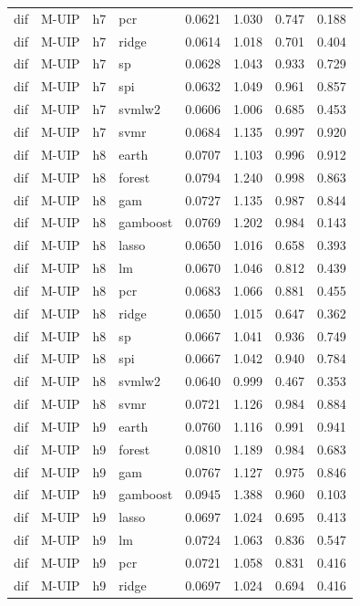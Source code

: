 \begin{ThreePartTable}
\begin{longtable}[t]{llclcccc}
dif & M-UIP & h7 & pcr & 0.0621 & 1.030 & 0.747 & 0.188\\
dif & M-UIP & h7 & ridge & 0.0614 & 1.018 & 0.701 & 0.404\\
dif & M-UIP & h7 & sp & 0.0628 & 1.043 & 0.933 & 0.729\\
dif & M-UIP & h7 & spi & 0.0632 & 1.049 & 0.961 & 0.857\\
dif & M-UIP & h7 & svmlw2 & 0.0606 & 1.006 & 0.685 & 0.453\\
dif & M-UIP & h7 & svmr & 0.0684 & 1.135 & 0.997 & 0.920\\
\addlinespace
dif & M-UIP & h8 & earth & 0.0707 & 1.103 & 0.996 & 0.912\\
dif & M-UIP & h8 & forest & 0.0794 & 1.240 & 0.998 & 0.863\\
dif & M-UIP & h8 & gam & 0.0727 & 1.135 & 0.987 & 0.844\\
dif & M-UIP & h8 & gamboost & 0.0769 & 1.202 & 0.984 & 0.143\\
dif & M-UIP & h8 & lasso & 0.0650 & 1.016 & 0.658 & 0.393\\
dif & M-UIP & h8 & lm & 0.0670 & 1.046 & 0.812 & 0.439\\
dif & M-UIP & h8 & pcr & 0.0683 & 1.066 & 0.881 & 0.455\\
dif & M-UIP & h8 & ridge & 0.0650 & 1.015 & 0.647 & 0.362\\
dif & M-UIP & h8 & sp & 0.0667 & 1.041 & 0.936 & 0.749\\
dif & M-UIP & h8 & spi & 0.0667 & 1.042 & 0.940 & 0.784\\
dif & M-UIP & h8 & svmlw2 & 0.0640 & 0.999 & 0.467 & 0.353\\
dif & M-UIP & h8 & svmr & 0.0721 & 1.126 & 0.984 & 0.884\\
\addlinespace
dif & M-UIP & h9 & earth & 0.0760 & 1.116 & 0.991 & 0.941\\
dif & M-UIP & h9 & forest & 0.0810 & 1.189 & 0.984 & 0.683\\
dif & M-UIP & h9 & gam & 0.0767 & 1.127 & 0.975 & 0.846\\
dif & M-UIP & h9 & gamboost & 0.0945 & 1.388 & 0.960 & 0.103\\
dif & M-UIP & h9 & lasso & 0.0697 & 1.024 & 0.695 & 0.413\\
dif & M-UIP & h9 & lm & 0.0724 & 1.063 & 0.836 & 0.547\\
dif & M-UIP & h9 & pcr & 0.0721 & 1.058 & 0.831 & 0.416\\
dif & M-UIP & h9 & ridge & 0.0697 & 1.024 & 0.694 & 0.416\\

\end{longtable}
\end{ThreePartTable}
